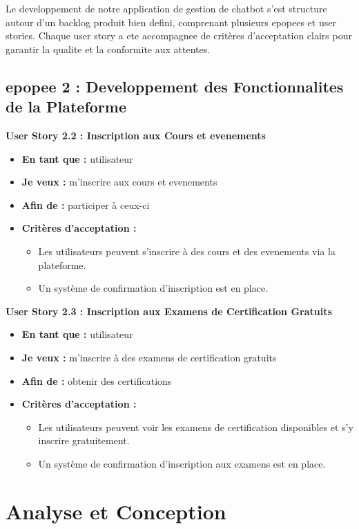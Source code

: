 \documentclass[a4paper, 11pt, openany]{report}
\begin{document}
Le developpement de notre application de gestion de chatbot s’est structure autour d’un backlog produit bien defini, comprenant plusieurs epopees et user stories. Chaque user story a ete accompagnee de critères d’acceptation clairs pour garantir la qualite et la conformite aux attentes.

\subsection{epopee 2 : Developpement des Fonctionnalites de la Plateforme}

\textbf{User Story 2.2 : Inscription aux Cours et evenements}
\begin{itemize}
    \item \textbf{En tant que :} utilisateur
    \item \textbf{Je veux :} m'inscrire aux cours et evenements
    \item \textbf{Afin de :} participer à ceux-ci
    \item \textbf{Critères d'acceptation :}
    \begin{itemize}
        \item Les utilisateurs peuvent s'inscrire à des cours et des evenements via la plateforme.
        \item Un système de confirmation d'inscription est en place.
    \end{itemize}
\end{itemize}

\textbf{User Story 2.3 : Inscription aux Examens de Certification Gratuits}
\begin{itemize}
    \item \textbf{En tant que :} utilisateur
    \item \textbf{Je veux :} m'inscrire à des examens de certification gratuits
    \item \textbf{Afin de :} obtenir des certifications
    \item \textbf{Critères d'acceptation :}
    \begin{itemize}
        \item Les utilisateurs peuvent voir les examens de certification disponibles et s'y inscrire gratuitement.
        \item Un système de confirmation d'inscription aux examens est en place.
    \end{itemize}
\end{itemize}


\section{Analyse et Conception}
\end{document}

